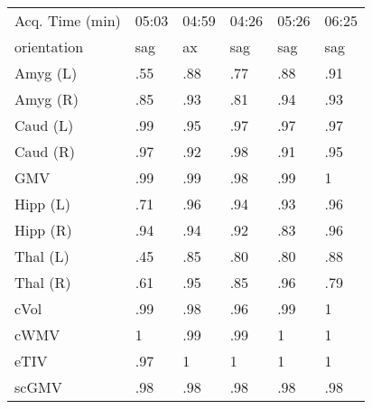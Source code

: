 \begin{table}
\begin{tabular}{llllll}
Acq. Time (min)       &           05:03 &           04:59 &           04:26 &           05:26 &           06:25 \\
orientation           &                sag &                 ax &                sag &                sag &                sag \\
Amyg (L)              &               .55 &               .88 &               .77 &               .88 &               .91 \\
Amyg (R)              &               .85 &               .93 &               .81 &               .94 &               .93 \\
Caud (L)              &               .99 &               .95 &               .97 &               .97 &               .97 \\
Caud (R)              &               .97 &               .92 &               .98 &               .91 &               .95 \\
GMV                   &               .99 &               .99 &               .98 &               .99 &               1   \\
Hipp (L)              &               .71 &               .96 &               .94 &               .93 &               .96 \\
Hipp (R)              &               .94 &               .94 &               .92 &               .83 &               .96 \\
Thal (L)              &               .45 &               .85 &               .80 &               .80 &               .88 \\
Thal (R)              &               .61 &               .95 &               .85 &               .96 &               .79 \\
cVol                  &               .99 &               .98 &               .96 &               .99 &               1   \\
cWMV                  &               1   &               .99 &               .99 &               1   &               1   \\
eTIV                  &               .97 &               1   &               1   &               1   &               1   \\
scGMV                 &               .98 &               .98 &               .98 &               .98 &               .98 \\
\bottomrule
\end{tabular}
\else
{}
\end{table}
